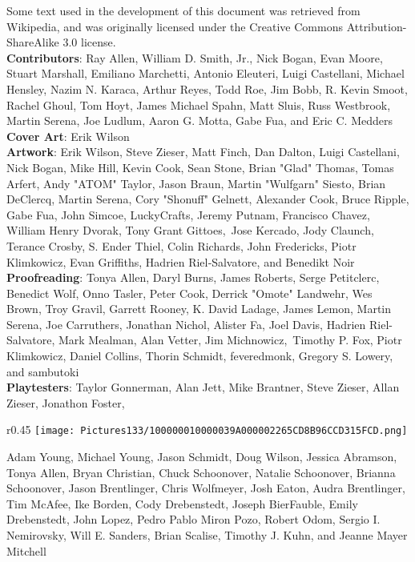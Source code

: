 \documentclass[a4paper,twoside,openany,10pt]{book}
\begin{document}
Some text used in the development of this document was retrieved from Wikipedia, and was originally licensed under the Creative Commons Attribution-ShareAlike 3.0 license.\\

\textbf{Contributors}: Ray Allen, William D. Smith, Jr., Nick Bogan, Evan Moore, Stuart Marshall, Emiliano Marchetti, Antonio Eleuteri, Luigi Castellani, Michael Hensley, Nazim N. Karaca, Arthur Reyes, Todd Roe, Jim Bobb, R. Kevin Smoot, Rachel Ghoul, Tom Hoyt, James Michael Spahn, Matt Sluis, Russ Westbrook, Martin Serena, Joe Ludlum, Aaron G. Motta, Gabe Fua, and Eric C. Medders\\

\textbf{Cover Art}: Erik Wilson\\

\textbf{Artwork}: Erik Wilson, Steve Zieser, Matt Finch, Dan Dalton, Luigi Castellani, Nick Bogan, Mike Hill, Kevin Cook, Sean Stone, Brian "Glad" Thomas, Tomas Arfert, Andy "ATOM" Taylor, Jason Braun, Martin "Wulfgarn" Siesto, Brian DeClercq, Martin Serena, Cory "Shonuff" Gelnett, Alexander Cook, Bruce Ripple, Gabe Fua, John Simcoe, LuckyCrafts, Jeremy Putnam, Francisco Chavez, William Henry Dvorak, Tony Grant Gittoes, \,Jose Kercado, Jody Claunch, Terance Crosby, S. Ender Thiel, Colin Richards, John Fredericks, Piotr Klimkowicz, Evan Griffiths, Hadrien Riel‑Salvatore, and Benedikt Noir\\

\textbf{Proofreading}: Tonya Allen, Daryl Burns, James Roberts, Serge Petitclerc, Benedict Wolf, Onno Tasler, Peter Cook, Derrick "Omote" Landwehr, Wes Brown, Troy Gravil, Garrett Rooney, K. David Ladage, James Lemon, Martin Serena, Joe Carruthers, Jonathan Nichol, Alister Fa, Joel Davis, Hadrien Riel-Salvatore, Mark Mealman, Alan Vetter, Jim Michnowicz, \,Timothy P. Fox, Piotr Klimkowicz, Daniel Collins, Thorin Schmidt, feveredmonk, Gregory S. Lowery, and sambutoki\\

\textbf{Playtesters}: Taylor Gonnerman, Alan Jett, Mike Brantner, Steve Zieser, Allan Zieser, Jonathon Foster, 
\begin{wrapfigure}{r}{0.45\textwidth}
	\texttt{[image: Pictures133/100000010000039A000002265CD8B96CCD315FCD.png]}
\end{wrapfigure}
Adam Young, Michael Young, Jason Schmidt, Doug Wilson, Jessica Abramson, Tonya Allen, Bryan Christian, Chuck Schoonover, Natalie Schoonover, Brianna Schoonover, Jason Brentlinger, Chris Wolfmeyer, Josh Eaton, Audra Brentlinger, Tim McAfee, Ike Borden, Cody Drebenstedt, Joseph BierFauble, Emily Drebenstedt, John Lopez, Pedro Pablo Miron Pozo, Robert Odom, Sergio I. Nemirovsky, Will E. Sanders, Brian Scalise, Timothy J. Kuhn, and Jeanne Mayer Mitchell\\
\end{document}
